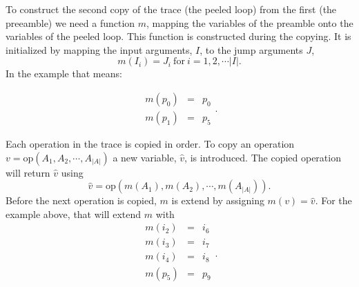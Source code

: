 \documentclass[preprint]{sigplanconf}
\begin{document}
To construct the second copy of the trace (the peeled loop) from the
first (the preeamble) we need a
function $m$, mapping the variables of the preamble onto the
variables of the peeled loop. This function is constructed during the
copying. It is initialized by mapping the input arguments, $I$, to
the jump arguments $J$,
\begin{equation}
  m\left(I_i\right) = J_i \ \text{for}\ i = 1, 2, \cdots |I| .
\end{equation}
In the example that means:

\begin{equation}
    \begin{array}{lcl}
      m\left(p_0\right) &=& p_0 \\
      m\left(p_1\right) &=& p_5
    \end{array}
  .
\end{equation}



Each operation in the trace is copied in order.
To copy an operation $v=\text{op}\left(A_1, A_2, \cdots, A_{|A|}\right)$
a new variable, $\hat v$, is introduced. The copied operation will
return $\hat v$ using
\begin{equation}
  \hat v = \text{op}\left(m\left(A_1\right), m\left(A_2\right), 
    \cdots, m\left(A_{|A|}\right)\right) . 
\end{equation}
Before the
next operation is copied, $m$ is extend by assigning $m\left(v\right) = \hat
v$. For the example above, that will extend $m$ with
\begin{equation}
    \begin{array}{lcl}
      m\left(i_2\right) &=& i_6 \\
      m\left(i_3\right) &=& i_7 \\
      m\left(i_4\right) &=& i_8 \\
      m\left(p_5\right) &=& p_9 \\
    \end{array}
  .
\end{equation}
\end{document}

